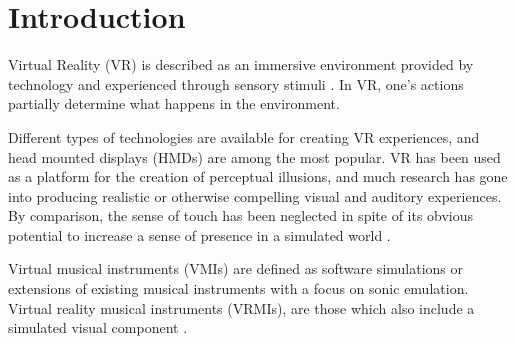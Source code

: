 \documentclass{article}
\title{\papertitle}
\begin{document}
%
\capstartfalse
\maketitle
\capstarttrue
%
\begin{abstract}
This paper presents DigiDrum - a novel virtual reality musical instrument (VRMI) which consists of a physical drum augmented by virtual reality (VR) to produce enhanced auditory and haptic feedback. We present the design and implementation of the instrument-setup together with the results of a user study which investigates user's haptic perception of the material stiffness of the drum membrane. We test whether tension in the membrane simulation and sound damping (how fast the sound dies out) change the user’s perception of membrane stiffness. We find that higher values for both tension and damping give the illusion of higher material stiffness in the drum membrane, where the sound damping appears to be the more important factor. Our ultimate goal is twofold: on the one hand we seek to create an instrument which allows for enhanced musical expression possibilities through virtual reality. On the other hand, we seek to investigate how haptics influence user interaction in VRMIs and present a preliminary study on this.
\end{abstract}


\section{Introduction}\label{sec:introduction}
Virtual Reality (VR) is described as an immersive environment provided by technology and experienced through sensory stimuli \cite{Serafin:2017}. In VR, one's actions partially determine what happens in the environment. 

Different types of technologies are available for creating VR experiences, and head mounted displays (HMDs) are among the most popular. VR has been used as a platform for the creation of perceptual illusions, and much research has gone into producing realistic or otherwise compelling visual and auditory experiences. By comparison, the sense of touch has been neglected in spite of its obvious potential to increase a sense of presence in a simulated world \cite{Serafin:2017}.

Virtual musical instruments (VMIs) are defined as software simulations or extensions of existing musical instruments with a focus on sonic emulation. Virtual reality musical instruments (VRMIs), are those which also include a simulated visual component \cite{Serafin:2016}. 
\end{document}
